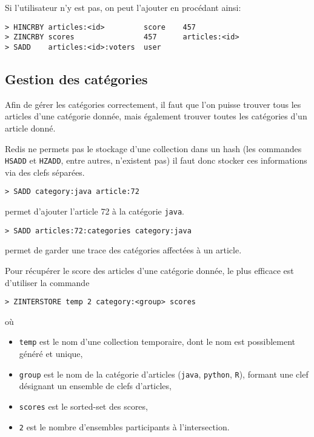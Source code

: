\documentclass[article,a4paper,12pt]{article}
\begin{document}
Si l'utilisateur n'y est pas, on peut l'ajouter en procédant ainsi:


\begin{verbatim}
> HINCRBY articles:<id>         score    457
> ZINCRBY scores                457      articles:<id>
> SADD    articles:<id>:voters  user
\end{verbatim}


\subsection{Gestion des catégories}
\label{sec:orgheadline10}

Afin de gérer les catégories correctement, il faut que l'on puisse trouver
tous les articles d'une catégorie donnée, mais également trouver toutes les
catégories d'un article donné.

Redis ne permets pas le stockage d'une collection dans un hash (les commandes
\texttt{HSADD} et \texttt{HZADD}, entre autres, n'existent pas) il faut donc stocker ces
informations via des clefs séparées.

\begin{verbatim}
> SADD category:java article:72
\end{verbatim}
permet d'ajouter l'article 72 à la catégorie \texttt{java}.

\begin{verbatim}
> SADD articles:72:categories category:java
\end{verbatim}
permet de garder une trace des catégories affectées à un article.

Pour récupérer le score des articles d'une catégorie donnée, le plus efficace
est d'utiliser la commande
\begin{verbatim}
> ZINTERSTORE temp 2 category:<group> scores
\end{verbatim}
où
\begin{itemize}
\item \texttt{temp} est le nom d'une collection temporaire, dont le nom est possiblement
généré et unique,
\item \texttt{group} est le nom de la catégorie d'articles (\texttt{java}, \texttt{python}, \texttt{R}),
formant une clef désignant un ensemble de clefs d'articles,
\item \texttt{scores} est le sorted-set des scores,
\item \texttt{2} est le nombre d'ensembles participants à l'intersection.
\end{itemize}
\end{document}
